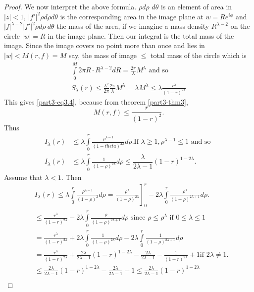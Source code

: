 \begin{proof}
We now interpret the above formula. $\rho d\rho$ $d\theta$ is an
element of area in $|z|<1$, $|f'|^{2}\rho d\rho d\theta$ is the
corresponding area in the image plane at $w=Re^{i\phi}$ and
$|f|^{\lambda-2}|f'|^{2}\rho d\rho \ d\theta$ the mass of the area,
if we imagine a mass density $R^{\lambda-2}$ on the circle $|w|=R$ in
the image plane. Then our integral is the total mass of the
image. Since the image covers no point more than once and lies in
$|w|<M(r,f)=M$ say, the mass of image $\leq$ total mass of the circle
which is
\begin{gather*}
\int\limits^{M}_{0}2\pi R\cdot
R^{\lambda-2}dR=\frac{2\pi}{\lambda}M^{\lambda}\text{ \  and so}\\
S_{\lambda}(r)\leq
\frac{\lambda^{2}}{2\pi}\frac{2\pi}{\lambda}M^{\lambda}=\lambda
M^{\lambda}\leq \lambda \frac{r^{\lambda}}{(1-r)^{2\lambda}}
\end{gather*}
This gives \eqref{part3-eq3.4}, because from theorem \ref{part3-thm3}, 
$$
M(r,f)\leq \frac{r}{(1-r)^{2}}.
$$\pageoriginale
Thus
\begin{align*}
I_{\lambda}(r) &\leq
\lambda\int\limits^{r}_{0}\frac{\rho^{\lambda-1}}{(1-theta)^{2\lambda}}d\rho. \text{
  \ If \ } \lambda\geq 1, \rho^{\lambda-1}\leq 1 \text{ \ and so }\\
I_{\lambda}(r) &\leq
\lambda\int\limits^{r}_{0}\frac{1}{(1-\rho)^{2\lambda}}d\rho\leq
\dfrac{\lambda}{2\lambda-1}(1-r)^{1-2\lambda}. 
\end{align*}
Assume that $\lambda<1$. Then
\begin{align*}
& \left. I_{\lambda}(r)\leq
  \lambda\int\limits^{r}_{0}\frac{\rho^{\lambda-1}}{(1-\rho)^{2}}d\rho=\frac{\rho^{\lambda}}{(1-\rho)^{2\lambda}}\right]^{r}_{0}-2\lambda\int\limits^{r}_{0}\frac{\rho^{\lambda}}{(1-\rho)^{2\lambda+1}}d\rho.\\
&\leq
\frac{r^{\lambda}}{(1-r)^{2\lambda}}-2\lambda\int\limits^{r}_{0}\frac{\rho}{(1-\rho)^{2\lambda+1}}d\rho
\text{ \  since \ }\rho\leq \rho^{\lambda}\text{ \  if \ } 0\leq
\lambda\leq 1\\
&=
\frac{r^{\lambda}}{(1-r)^{2\lambda}}+2\lambda\int\limits^{r}_{0}\frac{1}{(1-\rho)^{2\lambda}}d\rho
-2\lambda \int\limits^{r}_{0}\frac{1}{(1-\rho)^{2\lambda+1}}d\rho\\
&=
\frac{r^{\lambda}}{(1-r)^{2\lambda}}+\frac{2\lambda}{2\lambda-1}(1-r)^{1-2\lambda}-\frac{2\lambda}{2\lambda-1}-\frac{1}{(1-r)^{2\lambda}}+1\text{
  \ if \ } 2\lambda\neq 1.\\
&\leq
\frac{2\lambda}{2\lambda-1}(1-r)^{1-2\lambda}-\frac{2\lambda}{2\lambda-1}+1\leq
\frac{2\lambda}{2\lambda-1}(1-r)^{1-2\lambda}\\
\end{align*}


\end{proof}
